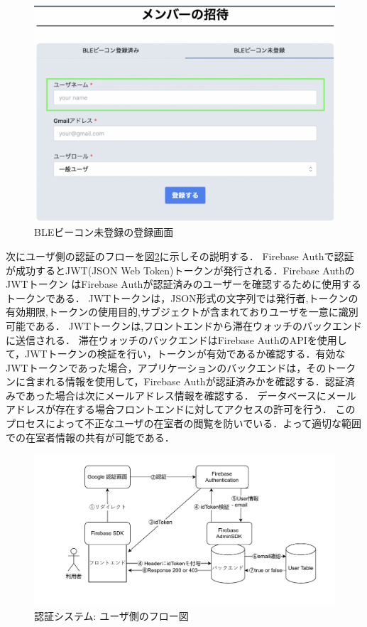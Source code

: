 \begin{figure}[tbh]
  \centering
  \includegraphics[width=16cm]{image/registerNotBLE.png}
  \caption{BLEビーコン未登録の登録画面} \label{fig:registerNotBLE}

\end{figure}


\newpage


次にユーザ側の認証のフローを図\ref{fig:userLogin}に示しその説明する．
Firebase Authで認証が成功するとJWT(JSON Web Token)トークンが発行される．Firebase AuthのJWTトークン はFirebase Authが認証済みのユーザーを確認するために使用するトークンである．
JWTトークンは，JSON形式の文字列では発行者,トークンの有効期限,トークンの使用目的,サブジェクトが含まれておりユーザを一意に識別可能である．
JWTトークンは,フロントエンドから滞在ウォッチのバックエンドに送信される．
滞在ウォッチのバックエンドはFirebase AuthのAPIを使用して，JWTトークンの検証を行い，トークンが有効であるか確認する．有効なJWTトークンであった場合，アプリケーションのバックエンドは，そのトークンに含まれる情報を使用して，Firebase Authが認証済みかを確認する．認証済みであった場合は次にメールアドレス情報を確認する．
データベースにメールアドレスが存在する場合フロントエンドに対してアクセスの許可を行う．
このプロセスによって不正なユーザの在室者の閲覧を防いでいる．よって適切な範囲での在室者情報の共有が可能である．



\newpage

\begin{figure}[h]
  \centering  %
  \includegraphics[clip,scale = 0.8]{image/userLogin.pdf}
  \caption{認証システム: ユーザ側のフロー図}    \label{fig:userLogin}
\end{figure}


